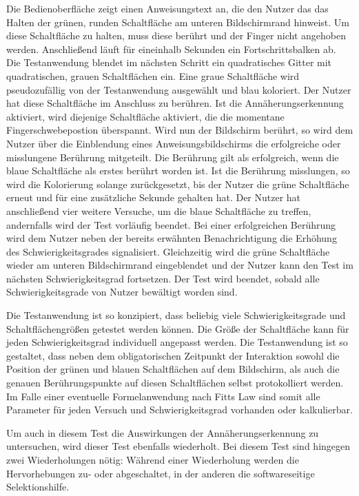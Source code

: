 \documentclass[a4paper,12pt,bibliography=totoc]{scrreprt}%
\begin{document}
Die Bedienoberfläche zeigt einen Anweisungstext an, die den Nutzer das das Halten der grünen, runden Schaltfläche am unteren Bildschirmrand hinweist. Um diese Schaltfläche zu halten, muss diese berührt und der Finger nicht angehoben werden. Anschließend läuft für eineinhalb Sekunden ein Fortschrittsbalken ab. Die Testanwendung blendet im nächsten Schritt ein quadratisches Gitter mit quadratischen, grauen Schaltflächen ein. Eine graue Schaltfläche wird pseudozufällig von der Testanwendung ausgewählt und blau koloriert. Der Nutzer hat diese Schaltfläche im Anschluss zu berühren. Ist die Annäherungserkennung aktiviert, wird diejenige Schaltfläche aktiviert, die die momentane Fingerschwebepostion überspannt. Wird nun der Bildschirm berührt, so wird dem Nutzer über die Einblendung eines Anweisungsbildschirms die erfolgreiche oder misslungene Berührung mitgeteilt. Die Berührung gilt als erfolgreich, wenn die blaue Schaltfläche als erstes berührt worden ist.
Ist die Berührung misslungen, so wird die Kolorierung solange zurückgesetzt, bis der Nutzer die grüne Schaltfläche erneut und für eine zusätzliche Sekunde gehalten hat. Der Nutzer hat anschließend vier weitere Versuche, um die blaue Schaltfläche zu treffen, andernfalls wird der Test vorläufig beendet.
Bei einer erfolgreichen Berührung wird dem Nutzer neben der bereits erwähnten Benachrichtigung die Erhöhung des Schwierigkeitsgrades signalisiert. Gleichzeitig wird die grüne Schaltfläche wieder am unteren Bildschirmrand eingeblendet und der Nutzer kann den Test im nächsten Schwierigkeitsgrad fortsetzen. Der Test wird beendet, sobald alle Schwierigkeitsgrade von Nutzer bewältigt worden sind.

Die Testanwendung ist so konzipiert, dass beliebig viele Schwierigkeitsgrade und Schaltflächengrößen getestet werden können. Die Größe der Schaltfläche kann für jeden Schwierigkeitsgrad individuell angepasst werden. Die Testanwendung ist so gestaltet, dass neben dem obligatorischen Zeitpunkt der Interaktion sowohl die Position der grünen und blauen Schaltflächen auf dem Bildschirm, als auch die genauen Berührungspunkte auf diesen Schaltflächen selbst protokolliert werden. Im Falle einer eventuelle Formelanwendung nach Fitts Law sind somit alle Parameter für jeden Versuch und Schwierigkeitsgrad vorhanden oder kalkulierbar.

Um auch in diesem Test die Auswirkungen der Annäherungserkennung zu untersuchen, wird dieser Test ebenfalls wiederholt. Bei diesem Test sind hingegen zwei Wiederholungen nötig: Während einer Wiederholung werden die Hervorhebungen zu- oder abgeschaltet, in der anderen die softwareseitige Selektionshilfe.
\end{document}
